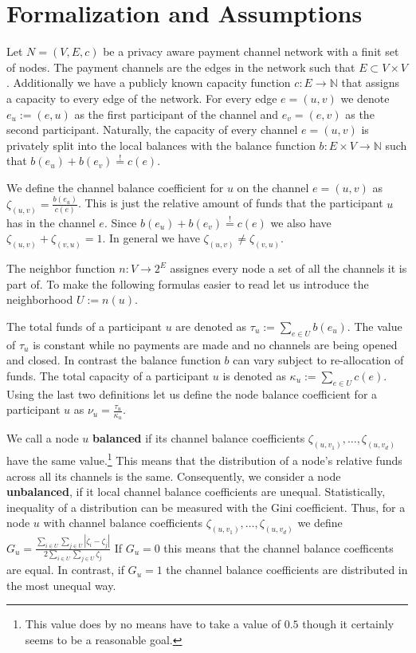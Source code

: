 \documentclass[a4paper]{paper}
\begin{document}
\section{Formalization and Assumptions}
\label{sec:formalization}

Let $N=(V,E,c)$ be a privacy aware payment channel network with a finit set of nodes.
The payment channels are the edges in the network such that $E\subset V\times V$.
Additionally we have a publicly known capacity function $c: E\longrightarrow \mathbb{N}$ that assigns a capacity to every edge of the network.
For every edge $e=(u,v)$ we denote $e_u:=(e,u)$ as the first participant of the channel and $e_v=(e,v)$ as the second participant.
Naturally, the capacity of every channel $e=(u,v)$ is privately split into the local balances with the balance function $b: E\times V\longrightarrow\mathbb{N}$ such that $b(e_u)+b(e_v)\stackrel{!}{=}c(e)$.

We define the channel balance coefficient for $u$ on the channel $e=(u,v)$ as  $\zeta_{(u,v)} = \frac{b(e_u)}{c(e)}$.
This is just the relative amount of funds that the participant $u$ has in the channel $e$.
Since $b(e_u)+b(e_v)\stackrel{!}{=}c(e)$ we also have $\zeta_{(u,v)} + \zeta_{(v,u)}=1$.
In general we have $\zeta_{(u,v)} \neq \zeta_{(v,u)}$.

The neighbor function $n : V \longrightarrow 2^{E}$ assignes every node a set of all the channels it is part of.
To make the following formulas easier to read let us introduce the neighborhood $U:=n(u)$.

The total funds of a participant $u$ are denoted as $\tau_u:=\displaystyle{\sum_{e\in U}b(e_u)}$.
The value of $\tau_u$ is constant while no payments are made and no channels are being opened and closed.
In contrast the balance function $b$ can vary subject to re-allocation of funds.
The total capacity of a participant $u$ is denoted as $\kappa_u:=\displaystyle{\sum_{e\in U}c(e)}$.
Using the last two definitions let us define the node balance coefficient for a participant $u$ as $\nu_u = \frac{\tau_u}{\kappa_u}$.

We call a node $u$ {\bf balanced} if its channel balance coefficients $\zeta_{(u,v_1)},\dots,\zeta_{(u,v_d)}$ have the same value.\footnote{This value does by no means have to take a value of $0.5$ though it certainly seems to be a reasonable goal.}
This means that the distribution of a node's relative funds across all its channels is the same.
Consequently, we consider a node {\bf unbalanced}, if it local channel balance coefficients are unequal.
Statistically, inequality of a distribution can be measured with the Gini coefficient.
Thus, for a node $u$ with channel balance coefficients $\zeta_{(u,v_1)},\dots,\zeta_{(u,v_d)}$ we define $G_u = \frac{\displaystyle{\sum_{i\in U} \sum_{j \in U}} | \zeta_i - \zeta_j |}{2 \displaystyle{\sum_{i \in U} \sum_{j \in U} \zeta_j}}$
If $G_u = 0$ this means that the channel balance coefficents are equal.
In contrast, if $G_u = 1$ the channel balance coefficients are distributed in the most unequal way.
\end{document}
